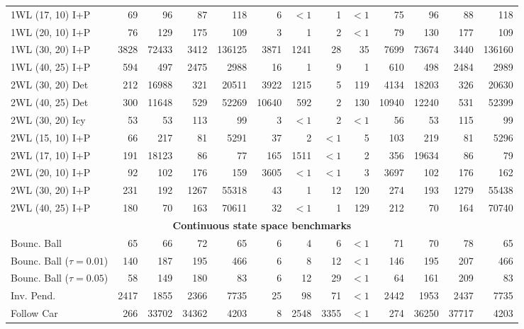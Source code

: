 {\begin{tabular}{|l|rrrr|rrrr|rrrr|}
1WL (17, 10) I+P & 69 & 96 & 87 & 118 & 6 & ${<}1$ & 1 & ${<}1$ & 75 & 96 & 88 & 118 \\
1WL (20, 10) I+P & 76 & 129 & 175 & 109 & 3 & 1 & 2 & ${<}1$ & 79 & 130 & 177 & 109 \\
1WL (30, 20) I+P & 3828 & 72433 & 3412 & 136125 & 3871 & 1241 & 28 & 35 & 7699 & 73674 & 3440 & 136160 \\
1WL (40, 25) I+P & 594 & 497 & 2475 & 2988 & 16 & 1 & 9 & 1 & 610 & 498 & 2484 & 2989 \\
\hline
2WL (30, 20) Det & 212 & 16988 & 321 & 20511 & 3922 & 1215 & 5 & 119 & 4134 & 18203 & 326 & 20630 \\
2WL (40, 25) Det & 300 & 11648 & 529 & 52269 & 10640 & 592 & 2 & 130 & 10940 & 12240 & 531 & 52399 \\
\hline
2WL (30, 20) Icy & 53 & 53 & 113 & 99 & 3 & ${<}1$ & 2 & ${<}1$ & 56 & 53 & 115 & 99 \\
\hline
2WL (15, 10) I+P & 66 & 217 & 81 & 5291 & 37 & 2 & ${<}1$ & 5 & 103 & 219 & 81 & 5296 \\
2WL (17, 10) I+P & 191 & 18123 & 86 & 77 & 165 & 1511 & ${<}1$ & 2 & 356 & 19634 & 86 & 79 \\
2WL (20, 10) I+P & 92 & 102 & 176 & 159 & 3605 & ${<}1$ & ${<}1$ & 3 & 3697 & 102 & 176 & 162 \\
2WL (30, 20) I+P & 231 & 192 & 1267 & 55318 & 43 & 1 & 12 & 120 & 274 & 193 & 1279 & 55438 \\
2WL (40, 25) I+P & 180 & 70 & 163 & 70611 & 32 & ${<}1$ & 1 & 129 & 212 & 70 & 164 & 70740 \\
\hline
\multicolumn{13}{|c|}{\textbf{Continuous state space benchmarks}}\\\hline
Bounc. Ball & 65 & 66 & 72 & 65 & 6 & 4 & 6 & ${<}1$ & 71 & 70 & 78 & 65 \\
Bounc. Ball ($\tau=0.01$) & 140 & 187 & 195 & 466 & 6 & 8 & 12 & ${<}1$ & 146 & 195 & 207 & 466 \\
Bounc. Ball ($\tau=0.05$) & 58 & 149 & 180 & 83 & 6 & 12 & 29 & ${<}1$ & 64 & 161 & 209 & 83 \\
\hline
Inv. Pend. & 2417 & 1855 & 2366 & 7735 & 25 & 98 & 71 & ${<}1$ & 2442 & 1953 & 2437 & 7735 \\
\hline
Follow Car & 266 & 33702 & 34362 & 4203 & 8 & 2548 & 3355 & ${<}1$ & 274 & 36250 & 37717 & 4203 \\
\hline
\end{tabular}}
